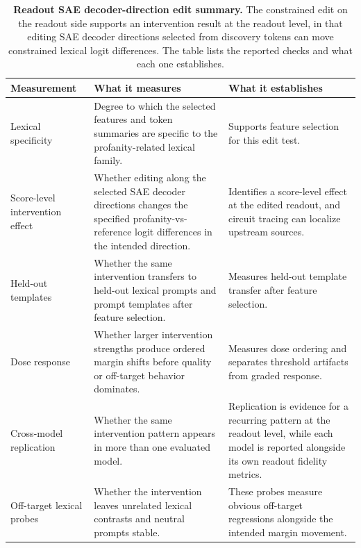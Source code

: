 \begin{table}[!tbp]
\caption{\textbf{Readout SAE decoder-direction edit summary.}
The constrained edit on the readout side supports an intervention result at the readout level, in that editing
SAE decoder directions selected from discovery tokens can move constrained lexical logit
differences. The table lists the reported checks and what each one
establishes.}
\label{tab:lexical-control-stress-test}
\centering
\footnotesize
\setlength{\tabcolsep}{4pt}
\renewcommand{\arraystretch}{1.08}
\begin{tabularx}{\textwidth}{@{}>{\RaggedRight\arraybackslash}p{}Y Y@{}}
\toprule
Measurement & What it measures & What it establishes \\
\midrule
Lexical specificity &
Degree to which the selected features and token summaries are specific to
the profanity-related lexical family. &
Supports feature selection for this edit test. \\
\addlinespace
Score-level intervention effect &
Whether editing along the selected SAE decoder directions changes the
specified profanity-vs-reference logit differences in the intended direction. &
Identifies a score-level effect at the edited readout, and circuit tracing
\citep{ameisen2025circuittracing} can localize upstream sources. \\
\addlinespace
Held-out templates &
Whether the same intervention transfers to held-out lexical prompts and prompt
templates after feature selection. &
Measures held-out template transfer after feature selection. \\
\addlinespace
Dose response &
Whether larger intervention strengths produce ordered margin shifts before
quality or off-target behavior dominates. &
Measures dose ordering and separates threshold artifacts from graded response. \\
\addlinespace
Cross-model replication &
Whether the same intervention pattern appears in more than one
evaluated model. &
Replication is evidence for a recurring pattern at the readout level, while each model
is reported alongside its own readout fidelity metrics. \\
\addlinespace
Off-target lexical probes &
Whether the intervention leaves unrelated lexical contrasts and neutral
prompts stable. &
These probes measure obvious off-target regressions alongside the intended
margin movement. \\
\bottomrule
\end{tabularx}
\end{table}

